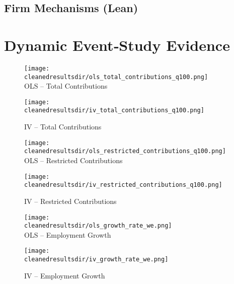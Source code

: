 \documentclass{article}
\newcommand{\cleanedresultsdir}{../../results/cleaned}
\begin{document}
\clearpage
\begin{landscape}
\subsection{Firm Mechanisms (Lean)}

\end{landscape}

\clearpage
\section{Dynamic Event‐Study Evidence}


\begin{figure}[H]
  \centering
  \texttt{[image: \\cleanedresultsdir/ols\_total\_contributions\_q100.png]}\\[2pt]
  \caption*{OLS – Total Contributions}
  \texttt{[image: \\cleanedresultsdir/iv\_total\_contributions\_q100.png]}\\[2pt]
  \caption*{IV – Total Contributions}
\end{figure}

\clearpage

\begin{figure}[H]
  \centering
  \texttt{[image: \\cleanedresultsdir/ols\_restricted\_contributions\_q100.png]}\\[2pt]
  \caption*{OLS – Restricted Contributions}
  \texttt{[image: \\cleanedresultsdir/iv\_restricted\_contributions\_q100.png]}\\[2pt]
  \caption*{IV – Restricted Contributions}
\end{figure}

\clearpage


\begin{figure}[H]
  \centering
  \texttt{[image: \\cleanedresultsdir/ols\_growth\_rate\_we.png]}\\[2pt]
  \caption*{OLS – Employment Growth}
  \texttt{[image: \\cleanedresultsdir/iv\_growth\_rate\_we.png]}\\[2pt]
  \caption*{IV – Employment Growth}
\end{figure}
\end{document}
